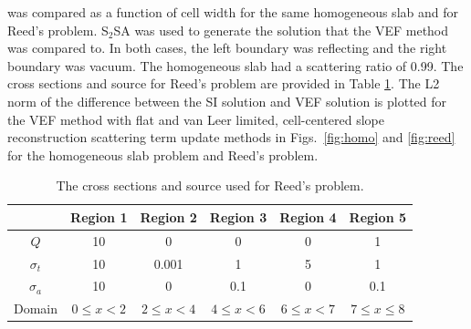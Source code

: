  was compared as a function of cell width for the same homogeneous slab and for Reed's problem. S$_2$SA was used to generate the \SN solution that the VEF method was compared to. In both cases, the left boundary was reflecting and the right boundary was vacuum. The homogeneous slab had a scattering ratio of 0.99. The cross sections and source for Reed's problem are provided in Table \ref{tab:reedXS}. The L2 norm of the difference between the SI solution and VEF solution is plotted for the VEF method with flat and van Leer limited, cell-centered slope reconstruction scattering term update methods in Figs.~\ref{fig:homo} and \ref{fig:reed} for the homogeneous slab problem and Reed's problem. 

	\begin{table} \centering
		\begin{tabular}{|c|c|c|c|c|c|}
			\hline
			& Region 1 & Region 2 & Region 3 & Region 4 & Region 5 \\ 
			\hline 
			$Q$ & 10 & 0 & 0 & 0 & 1 \\ 
			$\sigma_t$ & 10 & 0.001 & 1 & 5 & 1 \\ 
			$\sigma_a$ & 10 & 0 & 0.1 & 0 & 0.1 \\ 
			\hline 
			Domain & $0 \leq x < 2$ & $2 \leq x < 4$ & $4\leq x < 6$ &
				$6 \leq x < 7$ & $7 \leq x \leq 8$\\ 
			\hline 
		\end{tabular}
		\caption{The cross sections and source used for Reed's problem.}
		\label{tab:reedXS}
	\end{table}

